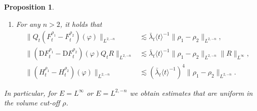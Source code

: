 \documentclass[11pt, a4paper]{scrartcl}
\numberwithin{equation}{section}
\theoremstyle{plain}
\newtheorem{proposition}[foo]{Proposition}
\theoremstyle{remark}
\newcommand{\mathD}{\mathrm{D}}
\newcommand{\tmtextbf}[1]{\text{{\bfseries{#1}}}}
\newenvironment{enumeratealpha}{\begin{enumerate}[a{\textup{)}}] }{\end{enumerate}}
\begin{document}
\begin{proposition}
\begin{enumeratealpha}
\begin{equation}
\begin{aligned}
        \bar{\lambda} \langle T_1 \wedge T_2 \rangle^{- \varepsilon},\\
        \sup_{t\geq0}\bar{\lambda}_t^{-1}\langle t\rangle^{1-2\varepsilon}\| (\mathD F^{T_1}_t - \mathD F_t^{T_2}) (\varphi) Q_t R
        \|_{L^\infty} & \lesssim \bar{\lambda} \langle T_1 \wedge T_2 \rangle^{-
        \varepsilon}  \| R \|_{L^\infty},\\
        \sup_{t\geq0}\bar{\lambda}_t^{-1}\langle t\rangle^{1-2\varepsilon}\| H^{T_1}_t - H_t^{T_2} (\varphi) \|_{L^\infty} & \lesssim 
        \bar{\lambda}^4 \langle T_1 \wedge T_2 \rangle^{- \varepsilon} .
      \end{aligned} \label{eq:fe-T-dependence}
    \end{equation}
    \item \tmtextbf{(Dependence on $\rho$)} \label{prop:fe-rho-dependence}For
    any $n > 2$, it holds that
    \begin{equation}
      \begin{aligned}
        \| Q_t (F^{\rho_1}_t - F_t^{\rho_2}) (\varphi) \|_{L^{2, - n}} &
        \lesssim \bar{\lambda}_t \langle t \rangle^{- 1} \| \rho_1 - \rho_2
        \|_{L^{2, - n}},\\[2ex]
        \| (\mathD F^{\rho_1}_t - \mathD F_t^{\rho_2}) (\varphi) Q_t R
        \|_{L^{2, - n}} & \lesssim \bar{\lambda}_t \langle t \rangle^{- 1} \|
        \rho_1 - \rho_2 \|_{L^{2, - n}}  \| R \|_{L^{\infty}},\\
        \| (H^{\rho_1}_t - H_t^{\rho_2}) (\varphi) \|_{L^{2, - n}} & \lesssim
        (\bar{\lambda}_t \langle t \rangle^{- 1})^4 \| \rho_1 - \rho_2 \|_{L^{2, -
        n}} .
      \end{aligned} \label{eq:fe-rho-dependence}
    \end{equation}
  \end{enumeratealpha}
  In particular, for $E=L^\infty$ or $E=L^{2,-n}$ we obtain estimates that are uniform in the volume cut-off $\rho$.
\end{proposition}
\end{document}
